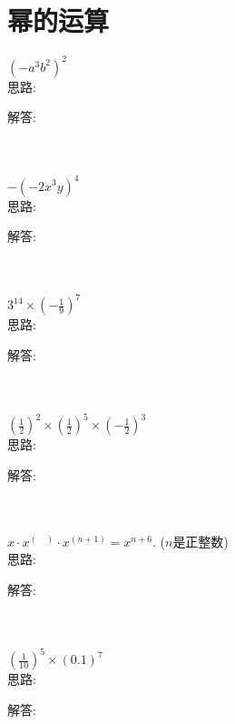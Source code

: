 \section{幂的运算}

\item {
    $ (-a^3b^2)^2$ 
    \ifshowSolution
        \fangsong{}
        \\
        思路:

        解答: 
    \else
        \\ \\ \\
    \fi
}

\item {
    $ -(-2x^3y)^4 $ 
    \ifshowSolution
        \fangsong{}
        \\
        思路:

        解答: 
    \else
        \\ \\ \\
    \fi
}

\item {
    $ 3^{14}\times (-\frac19)^7 $ 
    \ifshowSolution
        \fangsong{}
        \\
        思路:

        解答: 
    \else
        \\ \\ \\
    \fi
}

\item {
    $ (\frac12)^2\times (\frac12)^5\times (-\frac12)^3 $ 
    \ifshowSolution
        \fangsong{}
        \\
        思路:

        解答: 
    \else
        \\ \\ \\
    \fi
}

\item {
    $ x\cdot x^{(\quad)}\cdot x^{(n+1)} = x^{n+6}. $ ($n$是正整数) 
    \ifshowSolution
        \fangsong{}
        \\
        思路:

        解答: 
    \else
        \\ \\ \\
    \fi
}

\item {
    $ (\frac{1}{10})^5 \times (0.1)^7$
    \ifshowSolution
        \fangsong{}
        \\
        思路:

        解答: 
    \else
        \\ \\ \\
    \fi
}

